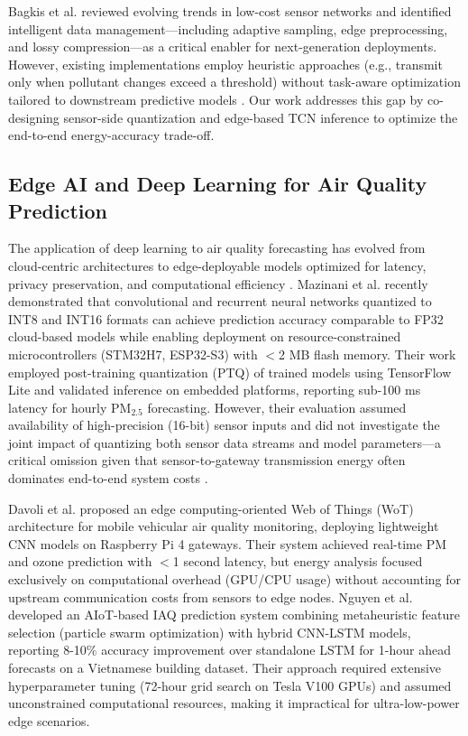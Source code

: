 Bagkis et al. \cite{bagkis2025evolving} reviewed evolving trends in low-cost sensor networks and identified intelligent data management—including adaptive sampling, edge preprocessing, and lossy compression—as a critical enabler for next-generation deployments. However, existing implementations employ heuristic approaches (e.g., transmit only when pollutant changes exceed a threshold) without task-aware optimization tailored to downstream predictive models \cite{cowell2025moving}. Our work addresses this gap by co-designing sensor-side quantization and edge-based TCN inference to optimize the end-to-end energy-accuracy trade-off.

\subsection{Edge AI and Deep Learning for Air Quality Prediction}

The application of deep learning to air quality forecasting has evolved from cloud-centric architectures to edge-deployable models optimized for latency, privacy preservation, and computational efficiency \cite{fici2025sensors, himeur2024edge}. Mazinani et al. \cite{mazinani2025air} recently demonstrated that convolutional and recurrent neural networks quantized to INT8 and INT16 formats can achieve prediction accuracy comparable to FP32 cloud-based models while enabling deployment on resource-constrained microcontrollers (STM32H7, ESP32-S3) with $<$2 MB flash memory. Their work employed post-training quantization (PTQ) of trained models using TensorFlow Lite and validated inference on embedded platforms, reporting sub-100 ms latency for hourly PM$_{2.5}$ forecasting. However, their evaluation assumed availability of high-precision (16-bit) sensor inputs and did not investigate the joint impact of quantizing both sensor data streams and model parameters—a critical omission given that sensor-to-gateway transmission energy often dominates end-to-end system costs \cite{khan2024artificial}.

Davoli et al. \cite{davoli2024edge} proposed an edge computing-oriented Web of Things (WoT) architecture for mobile vehicular air quality monitoring, deploying lightweight CNN models on Raspberry Pi 4 gateways. Their system achieved real-time PM and ozone prediction with $<$1 second latency, but energy analysis focused exclusively on computational overhead (GPU/CPU usage) without accounting for upstream communication costs from sensors to edge nodes. Nguyen et al. \cite{nguyen2025aiot} developed an AIoT-based IAQ prediction system combining metaheuristic feature selection (particle swarm optimization) with hybrid CNN-LSTM models, reporting 8-10\% accuracy improvement over standalone LSTM for 1-hour ahead forecasts on a Vietnamese building dataset. Their approach required extensive hyperparameter tuning (72-hour grid search on Tesla V100 GPUs) and assumed unconstrained computational resources, making it impractical for ultra-low-power edge scenarios.


